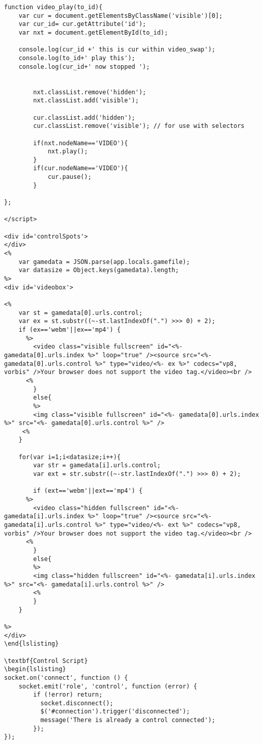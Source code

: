 \begin{lstlisting}
function video_play(to_id){
	var cur = document.getElementsByClassName('visible')[0];
	var cur_id= cur.getAttribute('id');
	var nxt = document.getElementById(to_id);
	
	console.log(cur_id +' this is cur within video_swap');
	console.log(to_id+' play this');
	console.log(cur_id+' now stopped ');

	
		nxt.classList.remove('hidden'); 
		nxt.classList.add('visible');

		cur.classList.add('hidden');
		cur.classList.remove('visible'); // for use with selectors

		if(nxt.nodeName=='VIDEO'){
			nxt.play();
		}
		if(cur.nodeName=='VIDEO'){
			cur.pause();
		}
	
};

</script>

<div id='controlSpots'>
</div>
<% 
	var gamedata = JSON.parse(app.locals.gamefile);
	var datasize = Object.keys(gamedata).length;
%>
<div id='videobox'>
	
<% 
	var st = gamedata[0].urls.control;
	var ex = st.substr((~-st.lastIndexOf(".") >>> 0) + 2);
	if (ex=='webm'||ex=='mp4') {
      %>
        <video class="visible fullscreen" id="<%- gamedata[0].urls.index %>" loop="true" /><source src="<%- gamedata[0].urls.control %>" type="video/<%- ex %>" codecs="vp8, vorbis" />Your browser does not support the video tag.</video><br />
      <%
      	}
      	else{
      	%>
      	<img class="visible fullscreen" id="<%- gamedata[0].urls.index %>" src="<%- gamedata[0].urls.control %>" />
     <%
 	}
	
	for(var i=1;i<datasize;i++){ 
		var str = gamedata[i].urls.control;
		var ext = str.substr((~-str.lastIndexOf(".") >>> 0) + 2);

		if (ext=='webm'||ext=='mp4') {
      %>
        <video class="hidden fullscreen" id="<%- gamedata[i].urls.index %>" loop="true" /><source src="<%- gamedata[i].urls.control %>" type="video/<%- ext %>" codecs="vp8, vorbis" />Your browser does not support the video tag.</video><br />
      <%
      	}
      	else{
      	%>
      	<img class="hidden fullscreen" id="<%- gamedata[i].urls.index %>" src="<%- gamedata[i].urls.control %>" />
      	<%
      	}     
	}

%>
</div>
\end{lslisting}

\textbf{Control Script}
\begin{lslisting}
socket.on('connect', function () {
	socket.emit('role', 'control', function (error) {
		if (!error) return;
		  socket.disconnect();
		  $('#connection').trigger('disconnected');
		  message('There is already a control connected');
		});
});


\end{lstlisting}
